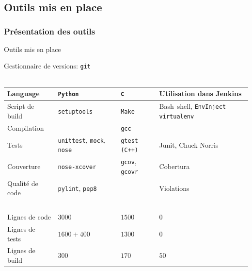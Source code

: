 \documentclass[9pt]{beamer}
\newcommand{\tocsubsection}{
  \begin{frame}
    \tableofcontents[
      currentsubsection,
      sectionstyle=show/shaded,
      subsectionstyle=show/shaded,
      subsubsectionstyle=show/show/shaded
    ]
  \end{frame}
}
\begin{document}
\subsection{Outils mis en place}
\tocsubsection

\subsubsection{Présentation des outils}
\begin{frame}{Outils mis en place}

  Gestionnaire de versions: \texttt{git} \\ ~ \\

  \begin{tabular}{ l | l l | p{3.5cm} }
    Language         & \texttt{Python}     & \texttt{C}    & Utilisation dans Jenkins \\ \hline
    Script de build  & \texttt{setuptools} & \texttt{Make} & Bash~shell, \texttt{EnvInject} \texttt{virtualenv}\\
    Compilation      & ~                   & \texttt{gcc}  & ~ \\
    Tests            & \texttt{unittest}, \texttt{mock}, \texttt{nose}
                     & \texttt{gtest} \texttt{(C++)}
                     & Junit, Chuck Norris\\
    Couverture       & \texttt{nose-xcover}
                     & \texttt{gcov}, \texttt{gcovr}
                     & Cobertura \\
   Qualité de code  & \texttt{pylint}, \texttt{pep8} & ~  & Violations \\
    ~ & ~  & ~ & \\
    Lignes de code   &  $3000$        &  $1500$  &  $0$  \\
    Lignes de tests  &  $1600 + 400$  &  $1300$  &  $0$  \\
    Lignes de build  &  $300$         &  $170$   &  $50$ \\

  \end{tabular}
\end{frame}
\end{document}
